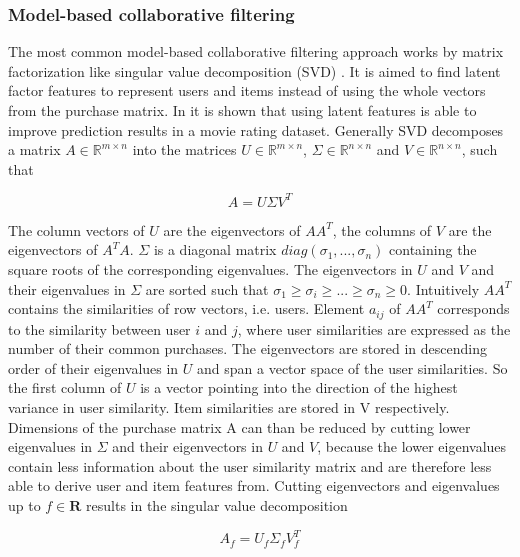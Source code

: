 \documentclass[10pt]{reportMaster}
\begin{document}
\subsubsection{Model-based collaborative filtering}
\label{sec:modelBasedCF}
The most common model-based collaborative filtering approach works by matrix factorization like singular value decomposition (SVD) \cite{svdGolubGeneral}.
It is aimed to find latent factor features to represent users and items instead of using the whole vectors from the purchase matrix.
In \cite{SVDNeuralNet} it is shown that using latent features is able to improve prediction results in a movie rating dataset.
Generally SVD decomposes a matrix $A \in \mathds{R}^{m \times n}$ into the matrices $U \in \mathds{R}^{m \times n}$, $\Sigma \in \mathds{R}^{n \times n}$ and $V \in \mathds{R}^{n \times n}$, such that 

\begin{equation}
	A = U \Sigma V^T
\end{equation}

The column vectors of $U$ are the eigenvectors of $AA^T$, the columns of $V$ are the eigenvectors of $A^TA$.
$\Sigma$ is a diagonal matrix $diag(\sigma_1, ..., \sigma_n)$ containing the square roots of the corresponding eigenvalues.  %
The eigenvectors in $U$ and $V$ and their eigenvalues in $\Sigma$ are sorted such that $\sigma_1 \geq \sigma_i \geq ... \geq \sigma_n \geq 0$.
Intuitively $AA^T$ contains the similarities of row vectors, i.e. users.
Element $a_{ij}$ of $AA^T$ corresponds to the similarity between user $i$ and $j$, where user similarities are expressed as the number of their common purchases.
The eigenvectors are stored in descending order of their eigenvalues in $U$ and span a vector space of the user similarities.
So the first column of $U$ is a vector pointing into the direction of the highest variance in user similarity. 
Item similarities are stored in V respectively.
Dimensions of the purchase matrix A can than be reduced by cutting lower eigenvalues in $\Sigma$ and their eigenvectors in $U$ and $V$, because the lower eigenvalues contain less information about the user similarity matrix and are therefore less able to derive user and item features from.
Cutting eigenvectors and eigenvalues up to $f \in \mathbf{R}$ results in the singular value decomposition 

\begin{equation}
	A_f = U_f \Sigma_f V_f^T
\end{equation}
\end{document}
